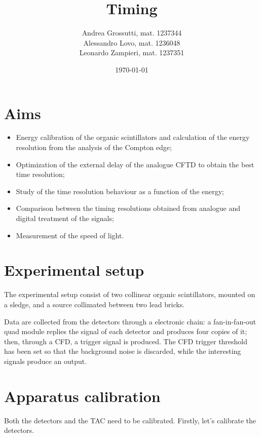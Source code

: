 \documentclass[11pt,a4 paper]{article}
\title{Timing}
\author{Andrea Grossutti, mat. 1237344\\Alessandro Lovo, mat. 1236048\\Leonardo Zampieri, mat. 1237351}
\date{\today}
\begin{document}
\maketitle

\section{Aims}
\begin{itemize}[noitemsep]
    \item Energy calibration of the organic scintillators and calculation of the energy resolution from the analysis of the Compton edge;
    \item Optimization of the external delay of the analogue CFTD to obtain the best time resolution;
    \item Study of the time resolution behaviour as a function of the energy;
    \item Comparison between the timing resolutions obtained from analogue and digital treatment of the signals;
    \item Measurement of the speed of light.
\end{itemize}

\section{Experimental setup}
The experimental setup consist of two collinear organic scintillators, mounted on a sledge, and a  source collimated between two lead bricks.

Data are collected from the detectors through a electronic chain: a fan-in-fan-out quad module replies the signal of each detector and produces four copies of it; then, through a CFD, a trigger signal is produced. The CFD trigger threshold has been set so that the background noise is discarded, while the interesting signals produce an output.

\section{Apparatus calibration}
Both the detectors and the TAC need to be calibrated. Firstly, let's calibrate the detectors.
\end{document}
